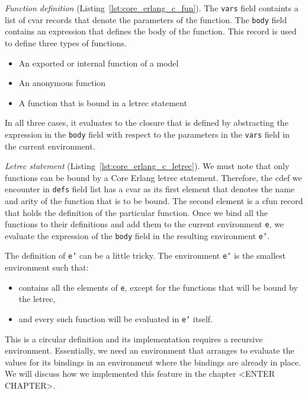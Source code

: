 \emph{Function definition} (Listing~\ref{lst:core_erlang_c_fun}).
The \texttt{vars} field containts a list of c\textunderscore var records that denote the parameters of
the function. The \texttt{body} field contains an expression that defines the body of
the function. This record is used to define three types of functions.

\begin{itemize}
  \item An exported or internal function of a model
  \item An anonymous function
  \item A function that is bound in a letrec statement
\end{itemize}

In all three cases, it evaluates to the closure that is defined by abstracting
the expression in the \texttt{body} field with respect to the parameters in the \texttt{vars}
field in the current environment.



\emph{Letrec statement} (Listing~\ref{lst:core_erlang_c_letrec}).
We must note that only functions can be bound by a Core Erlang letrec
statement. Therefore, the c\textunderscore def we encounter in \texttt{defs} field list has a c\textunderscore var as
its first element that denotes the name and arity of the function that is to be
bound. The second element is a c\textunderscore fun record that holds the definition of the
particular function. Once we bind all the functions to their definitions and
add them to the current environment \texttt{e}, we evaluate the expression of the \texttt{body}
field in the resulting environment \texttt{e’}.

The definition of \texttt{e’} can be a little tricky. The environment \texttt{e’} is the smallest
environment such that:

\begin{itemize}
  \item contains all the elements of \texttt{e}, except for the functions that will be
    bound by the letrec,
  \item and every such function will be evaluated in \texttt{e’} itself.
\end{itemize}

This is a circular definition and its implementation requires a recursive
environment. Essentially, we need an environment that arranges to evaluate the
values for its bindings in an environment where the bindings are already in
place. We will discuss how we implemented this feature in the chapter <ENTER
CHAPTER>.

